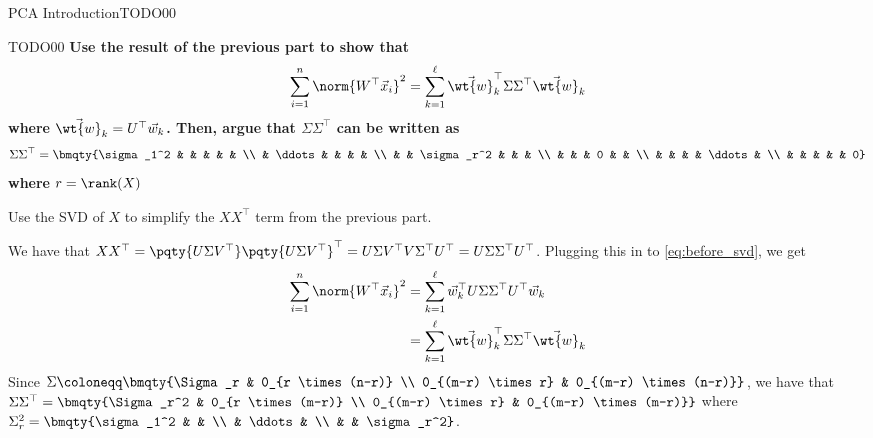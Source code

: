 \begin{problem}{PCA Introduction}{TODO}{0}{0}
\begin{problempartlist}
        \begin{problempart}{TODO}{0}{0}
            \textbf{Use the result of the previous part to show that
            \begin{equation}
                \sum_{i = 1}^n \norm{W^\top \vec{x}_i}^2 = \sum_{k = 1}^\ell \vec{\wt{w}}_k^\top \Sigma \Sigma^\top \vec{\wt{w}}_k
            \end{equation}
            where $\vec{\wt{w}}_k = U^\top \vec{w}_k$. Then, argue that $\Sigma \Sigma^\top$ can be written as
            \begin{equation}
                \Sigma \Sigma^\top = \bmqty{\sigma_1^2 & & & & & \\ & \ddots & & & & \\ & & \sigma_r^2 & & & \\ & & & 0 & & \\ & & & & \ddots & \\ & & & & & 0}
            \end{equation}
            where $r = \rank(X)$}
            \begin{hint}
                Use the SVD of $X$ to simplify the $X X^\top$ term from the previous part.
            \end{hint}
        \end{problempart}

        \begin{solution}{0in}
            We have that $X X^\top = \pqty{U \Sigma V^\top} \pqty{U \Sigma V^\top}^\top = U \Sigma V^\top V \Sigma^\top U^\top = U \Sigma \Sigma^\top U^\top$. Plugging this in to \cref{eq:before_svd}, we get
            \begin{align}
                \sum_{i = 1}^n \norm{W^\top \vec{x}_i}^2 &= \sum_{k = 1}^\ell \vec{w}_k^\top U \Sigma \Sigma^\top U^\top \vec{w}_k \\
                &= \sum_{k = 1}^\ell \vec{\wt{w}}_k^\top \Sigma \Sigma^\top \vec{\wt{w}}_k
            \end{align}
            Since $\Sigma \coloneqq \bmqty{\Sigma_r & 0_{r \times (n-r)} \\ 0_{(m-r) \times r} & 0_{(m-r) \times (n-r)}}$, we have that $\Sigma \Sigma^\top = \bmqty{\Sigma_r^2 & 0_{r \times (m-r)} \\ 0_{(m-r) \times r} & 0_{(m-r) \times (m-r)}}$ where $\Sigma_r^2 = \bmqty{\sigma_1^2 & & \\ & \ddots & \\ & & \sigma_r^2}$.
        \end{solution}


\end{problempartlist}
\end{problem}

